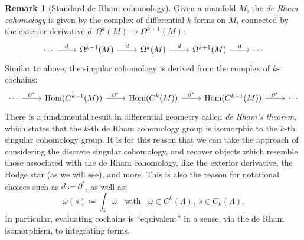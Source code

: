 \documentclass[aps,pra,showpacs,notitlepage,onecolumn,superscriptaddress,nofootinbib]{revtex4-1}
\theoremstyle{definition}
\newtheorem{remark}{Remark}[section]
\begin{document}
\begin{remark}[Standard de Rham cohomology]
  Given a manifold $M$, the \emph{de Rham cohomology} is given by the complex of differential $k$-forms on $M$, connected by the exterior derivative $d : \Omega^{k}(M) \rightarrow \Omega^{k + 1}(M)$:
  \[\begin{tikzcd}
  \cdots & {\Omega^{k - 1}(M)} & {\Omega^{k}(M)} & {\Omega^{k + 1}(M)} & \cdots
  \arrow["d", from=1-1, to=1-2]
  \arrow["d", from=1-2, to=1-3]
  \arrow["d", from=1-3, to=1-4]
  \arrow["d", from=1-4, to=1-5]
  \end{tikzcd}\]
  Similar to above, the singular cohomology is derived from the complex of $k$-cochains:
  \[\begin{tikzcd}
  \cdots & {\text{Hom}(C^{k - 1}(M))} & {\text{Hom}(C^{k}(M))} & {\text{Hom}(C^{k + 1}(M))} & \cdots
  \arrow["{\partial^{*}}", from=1-1, to=1-2]
  \arrow["{\partial^{*}}", from=1-2, to=1-3]
  \arrow["{\partial^{*}}", from=1-3, to=1-4]
  \arrow["{\partial^{*}}", from=1-4, to=1-5]
  \end{tikzcd}\]
  There is a fundamental result in differential geometry called \emph{de Rham's theorem}, which states that the $k$-th de Rham cohomology group is
  isomorphic to the $k$-th singular cohomology group. It is for this reason that we can take the approach of considering the discrete singular cohomology,
  and recover objects which resemble those associated with the de Rham cohomology, like the exterior derivative, the Hodge star (as we will see), and more.
  This is also the reason for notational choices such as $d \coloneqq \partial^{*}$, as well as:
  \begin{equation}
    \omega(s) \coloneqq \displaystyle\int_{s} \omega \ \ \ \ \text{with} \ \ \ \ \omega \in C^{k}(\Lambda), \ s \in C_k(\Lambda).
  \end{equation}
  In particular, evaluating cochains is ``equivalent'' in a sense, via the de Rham isomorphism, to integrating forms.
\end{remark}
\end{document}
